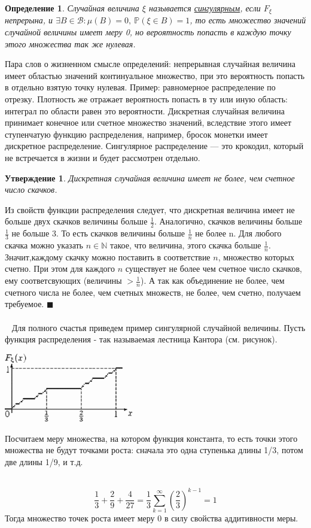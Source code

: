 \documentclass[12pt]{article}
\newtheorem{Def}{Определение}
\newtheorem{St}{Утверждение}
\newenvironment{Proof}{\par\noindent{\bf Доказательство}}{$\blacksquare$}
\newenvironment{Ex}{{\bf Пример}\ }{}
\numberwithin{Th}{section}
\numberwithin{Def}{section}
\numberwithin{Lem}{section}
\numberwithin{St}{section}
\numberwithin{equation}{section}
\newcommand\Pro{\mathbb{P}} %
\newcommand\Bor{\mathscr{B}} %
\begin{document}
\begin{Def}
	Случайная величина $\xi$  называется \underline{сингулярным}, если $F_\xi$ непрерына, и $\exists B \in \Bor \colon \mu(B) = 0, \ \Pro(\xi \in B) = 1$, то есть множество значений случайной величины имеет меру 0, но вероятность попасть в каждую точку этого множества так же нулевая.
\end{Def}

Пара слов о жизненном смысле определений: непрерывная случайная величина имеет областью значений континуальное множество, при это вероятность попасть в отдельно взятую точку нулевая. Пример: равномерное распределение по отрезку. Плотность же отражает вероятность попасть в ту или иную область: интеграл по области равен это вероятности. Дискретная случайная величина принимает конечное или счетное множество значений, вследствие этого имеет ступенчатую функцию распределения, например, бросок монетки имеет дискретное распределение. Сингулярное распределение --- это крокодил, который 
не встречается в жизни и будет рассмотрен отдельно.

\begin{St}
	Дискретная случайная величина имеет не более, чем счетное число скачков.
\end{St}
\begin{Proof}
Из свойств функции распределения следует, что дискретная величина имеет не больше двух скачков величины больше $\frac12$. Аналогично, скачков величины больше $\frac13$ не больше 3. То есть скачков величины больше $\frac1n$ не более n. Для любого скачка можно указать $n \in \mathbb{N}$ такое, что величина, этого скачка больше 
$\frac1n$. Значит,каждому скачку можно поставить в соответствие $n$, множество которых счетно. При этом для каждого $n$ существует не более чем счетное число скачков, ему соответсвующих (величины $>\frac1n$). А так как объединение не более, чем счетного числа не более, чем счетных множеств, не более, чем счетно, получаем 
требуемое. 
\end{Proof}\\ \\
\begin{Ex}
Для полного счастья приведем пример сингулярной случайной величины. Пусть функция распределения - так называемая лестница Кантора (см. рисунок).
\parbox[b][3 cm][t]{20mm}{\includegraphics[height=30mm]{kantor}}
\hfill
\parbox[b][3 cm][t]{100mm}{
	Посчитаем меру множества, на котором функция константа, то есть точки этого множества не будут точками роста: сначала это одна ступенька длины 1/3, потом две длины 1/9, и т.д.

}\\
	$$ \frac13 + \frac29 + \frac4{27} = \frac13 \sum\limits_{k=1}^\infty(\frac23)^{k-1} = 1$$
	Тогда множество точек роста имеет меру 0 в силу свойства аддитивности меры.
\end{Ex}
\\
\end{document}
